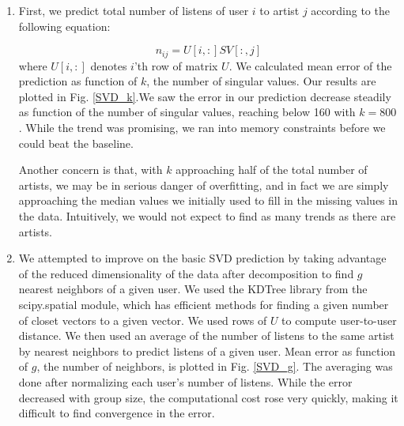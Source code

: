 \documentclass[11pt]{article}
\begin{document}
\begin{enumerate}
\item First, we predict total number of listens of user $i$ to artist $j$ according to the following equation:

\begin{equation}
n_{ij} = U[i,:]SV[:,j]
\end{equation}
where $U[i,:]$ denotes $i$'th row of matrix $U$. We calculated mean error of the prediction as function of $k$, the number of singular values. Our results are plotted in Fig. \ref{SVD_k}.We saw the error in our prediction decrease steadily as function of the number of singular values, reaching below 160 with $k = 800$. While the trend was promising, we ran into memory constraints before we could beat the baseline. 

Another concern is that, with $k$ approaching half of the total number of artists, we may be in serious danger of overfitting, and in fact we are simply approaching the median values we initially used to fill in the missing values in the data. Intuitively, we would not expect to find as many trends as there are artists.

\item We attempted to improve on the basic SVD prediction by taking advantage of the reduced dimensionality of the data after decomposition to find $g$ nearest neighbors of a given user. We used  the KDTree library from the scipy.spatial module, which has efficient methods for finding a given number of closet vectors to a given vector. We used rows of $U$ to compute user-to-user distance. We then used an average of the number of listens to the same artist by nearest neighbors to predict listens of a given user. Mean error as function of $g$, the number of neighbors, is plotted in Fig. \ref{SVD_g}. The averaging was done after normalizing each user's number of listens. While the error decreased with group size, the computational cost rose very quickly, making it difficult to find convergence in the error.
\end{enumerate}
\end{document}
